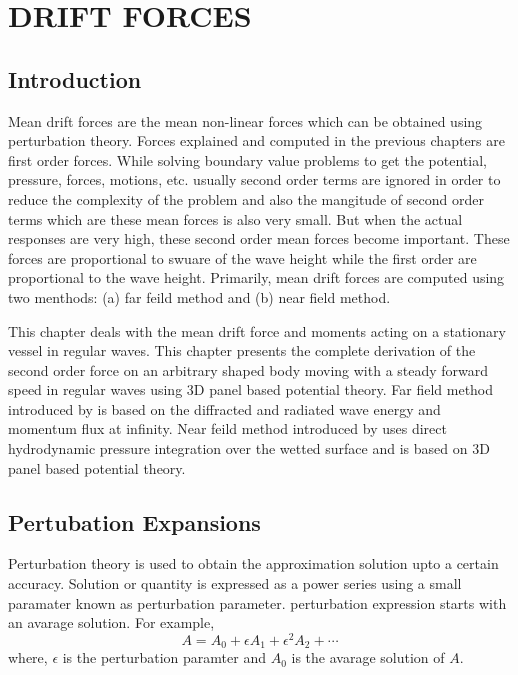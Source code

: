 \chapter{DRIFT FORCES}
\section{Introduction}
Mean drift forces are the mean non-linear forces which can be obtained using perturbation theory. 
Forces explained and computed in the previous chapters
are first order forces. While solving boundary value problems to get the potential, pressure, forces, 
motions, etc. usually
second order terms are ignored in order to reduce the complexity of the problem and also the mangitude of
second order terms which are these mean forces is also very small. But when the actual responses are very high,
these second order mean forces become important. These forces are proportional to swuare of the wave height 
while the 
first order are proportional to the wave height. Primarily, mean drift forces are computed using two menthods:
(a) far feild method and (b) near field method.

This chapter deals with the mean drift force and moments acting on a stationary vessel in regular waves. This chapter
presents the complete derivation of the second order force on an arbitrary shaped body moving with a steady 
forward speed in regular waves using 3D panel based potential theory. Far field method introduced by
\cite{maruo1957excess} is based on the diffracted and radiated wave energy and momentum flux at infinity. Near feild
method introduced by \cite{boese1970einfache} uses direct hydrodynamic pressure integration over the wetted surface and 
is based on 3D panel based potential theory.

\section{Pertubation Expansions}
\label{sec:perturbation_exp}
Perturbation theory is used to obtain the approximation solution upto a certain accuracy. Solution or quantity is 
expressed as a power series using a small paramater known as perturbation parameter. perturbation expression
starts with an avarage solution.
For example, 
\begin{equation}
    A = A_0 + \epsilon A_1 + \epsilon^2 A_2 + \cdots
\end{equation}
where, $\epsilon$ is the perturbation paramter and $A_0$ is the avarage solution of $A$.

